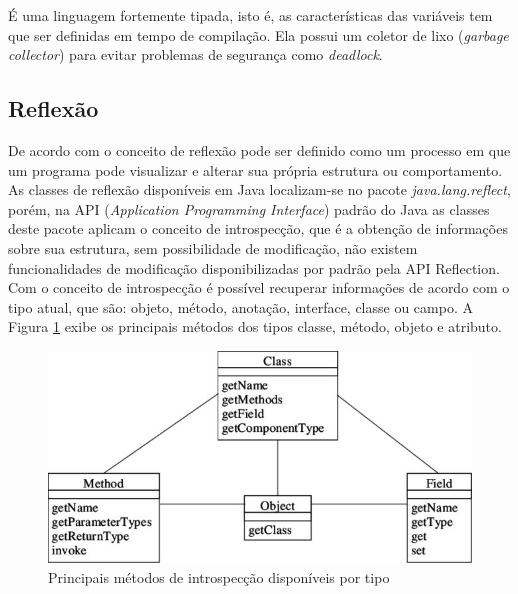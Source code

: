 \par É uma linguagem fortemente tipada, isto é, as características das variáveis tem que ser definidas em tempo de compilação. Ela possui um coletor de lixo (\textit{garbage collector}) para evitar problemas de segurança como \textit{deadlock}. \cite{joy2000java}

\subsection{Reflexão}

\par De acordo com  o conceito de reflexão pode ser definido como um processo em que um programa pode visualizar e alterar sua própria estrutura ou comportamento. As classes de reflexão disponíveis em Java localizam-se no pacote \textit{java.lang.reflect}, porém, na API (\textit{Application Programming Interface}) padrão do Java as classes deste pacote aplicam o conceito de introspecção, que é a obtenção de informações sobre sua estrutura, sem possibilidade de modificação, não existem funcionalidades de modificação disponibilizadas por padrão pela API Reflection. Com o conceito de introspecção é possível recuperar informações de acordo com o tipo atual, que são: objeto, método, anotação, interface, classe ou campo. A Figura \ref{fig:tipos-e-retornos-introspeccao} exibe os principais métodos dos tipos classe, método, objeto e atributo. 

\begin{figure}[H]
    \centering
    \includegraphics[scale=1]{src/imagens/cap2/metodos-introspeccao.jpg}
    \caption{Principais métodos de introspecção disponíveis por tipo}
    \label{fig:tipos-e-retornos-introspeccao}
\end{figure}

